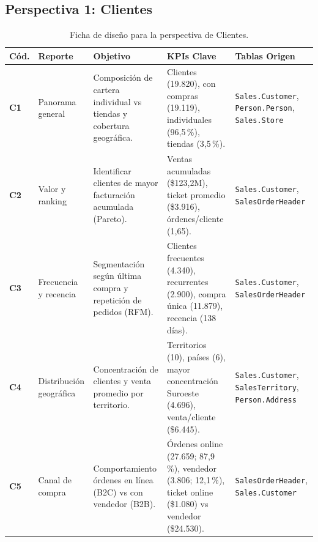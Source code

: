 \documentclass[11pt,letterpaper]{article}
\begin{document}
\subsection{Perspectiva 1: Clientes}
\begin{table}[H]
\centering
\small
\begin{tabularx}{\textwidth}{lp{3.2cm}p{4.2cm}Xp{2.8cm}}
\toprule
\textbf{Cód.} & \textbf{Reporte} & \textbf{Objetivo} & \textbf{KPIs Clave} & \textbf{Tablas Origen} \\
\midrule
\textbf{C1} & Panorama general & Composición de cartera individual vs tiendas y cobertura geográfica. & Clientes (19.820), con compras (19.119), individuales (96,5\,\%), tiendas (3,5\,\%). & \texttt{Sales.Customer}, \texttt{Person.Person}, \texttt{Sales.Store} \\
\addlinespace
\textbf{C2} & Valor y ranking & Identificar clientes de mayor facturación acumulada (Pareto). & Ventas acumuladas (\$123,2M), ticket promedio (\$3.916), órdenes/cliente (1,65). & \texttt{Sales.Customer}, \texttt{SalesOrderHeader} \\
\addlinespace
\textbf{C3} & Frecuencia y recencia & Segmentación según última compra y repetición de pedidos (RFM). & Clientes frecuentes (4.340), recurrentes (2.900), compra única (11.879), recencia (138 días). & \texttt{Sales.Customer}, \texttt{SalesOrderHeader} \\
\addlinespace
\textbf{C4} & Distribución geográfica & Concentración de clientes y venta promedio por territorio. & Territorios (10), países (6), mayor concentración Suroeste (4.696), venta/cliente (\$6.445). & \texttt{Sales.Customer}, \texttt{SalesTerritory}, \texttt{Person.Address} \\
\addlinespace
\textbf{C5} & Canal de compra & Comportamiento órdenes en línea (B2C) vs con vendedor (B2B). & Órdenes online (27.659; 87,9\,\%), vendedor (3.806; 12,1\,\%), ticket online (\$1.080) vs vendedor (\$24.530). & \texttt{SalesOrderHeader}, \texttt{Sales.Customer} \\
\bottomrule
\end{tabularx}
\caption{Ficha de diseño para la perspectiva de Clientes.}
\end{table}
\end{document}
